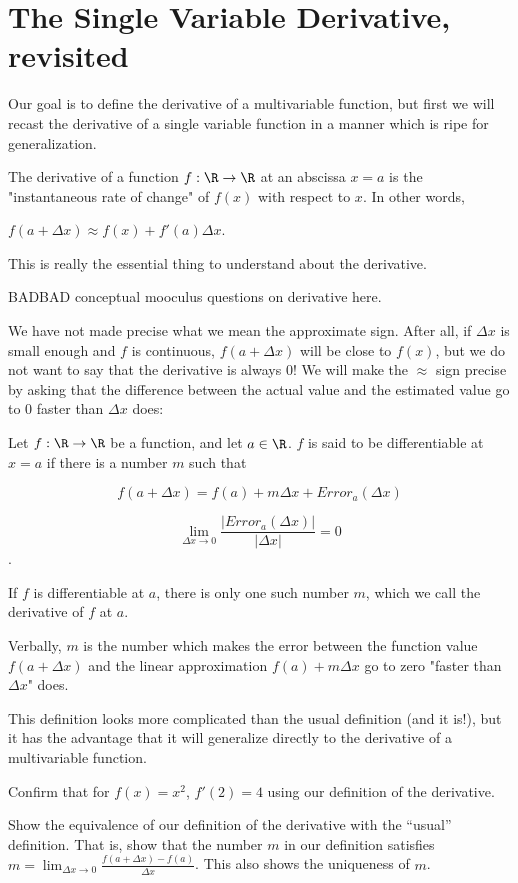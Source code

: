 
\section{The Single Variable Derivative, revisited}
	
	Our goal is to define the derivative of a multivariable function, but first we will recast the derivative of a single variable function in a
	manner which is ripe for generalization.
	
	The derivative of a function $f:\R \to \R$ at an abscissa $x = a$ is the "instantaneous rate of change" of $f(x)$ with respect to $x$.
	In other words, 
	
	$f(a + \Delta x) \approx f(x) +f'(a)\Delta x$.
	
	This is really the essential thing to understand about the derivative.
	
	BADBAD conceptual mooculus questions on derivative here.
	
	We have not made precise what we mean the approximate sign.  After all, if $\Delta x$ is small enough and $f$ is continuous, 
	$f(a+\Delta x)$ will be close to $f(x)$, but we do not want to say that the derivative is always $0$!  We will make the  $\approx$ sign precise by asking that the difference 
	between the actual value and the estimated value go to $0$ faster than $\Delta x$ does:
	
	\begin{definition}
		Let $f: \R \to \R$ be a function, and let $a \in \R$.  $f$ is said to be differentiable at $x=a$ if there is a number $m$ such that 
		
		\[ f(a+\Delta x) = f(a) + m\Delta x + Error_a(\Delta x)\]
		
		\[ \lim_{\Delta x \to 0} \frac{\left|Error_a(\Delta x)|}{\left|\Delta x\right|} = 0 \].
		
		If $f$ is differentiable at $a$, there is only one such number $m$, which we call the derivative of $f$ at $a$.  
		
		Verbally,  $m$ is the number which makes the error between the function value $f(a+\Delta x)$ and the linear approximation $f(a)+m\Delta x$ go to zero 
		"faster than $\Delta x$" does.
	\end{definition}
	
	This definition looks more complicated than the usual definition (and it is!), but it has the advantage that it will 
	generalize directly to the derivative of a multivariable function.
	
	\begin{question}
		Confirm that for $f(x)=x^2$, $f'(2)=4$ using our definition of the derivative.
	\end{question}
	
	\begin{question}
		Show the equivalence of our definition of the derivative with the ``usual'' definition.  That is, show that the number $m$ in our definition satisfies
		$m = \lim_{\Delta x \to 0}\frac{f(a+\Delta x)-f(a)}{\Delta x}$.  This also shows the uniqueness of $m$.
	\end{question}
	
	